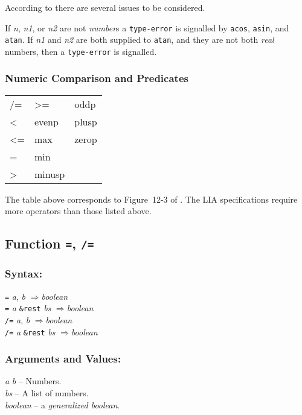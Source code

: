 \documentclass[10pt,fleqn]{article}
\newcommand{\code}[1]{\texttt{#1}}
\newcommand{\varname}[1]{\textit{#1}}
\newcommand{\clterm}[1]{\textit{#1}}
\newcommand{\RArrow}{$\Rightarrow$}
\newcommand{\DDictionaryItem}[1]{\vspace*{6pt}\noindent\hrulefill\vspace*{-9pt}\subsection*{#1}}
\newcommand{\DSyntax}{\subsubsection*{Syntax:}}
\newcommand{\DArgsNValues}{\subsubsection*{Arguments and Values:}}
\begin{document}
According to \cite{2008:IEEE-754} there are several issues to be
considered.

If \varname{n}, \varname{n1}, or \varname{n2} are not \clterm{number}s
a \code{type-error} is signalled by \code{acos}, \code{asin}, and
\code{atan}.  If \varname{n1} and \varname{n2} are both supplied to
\code{atan}, and they are not both \clterm{real} numbers, then a
\code{type-error} is signalled.


\newpage

\subsubsection*{Numeric Comparison and Predicates}

\begin{tt}
  \begin{tabular}{lll}
    /= &  >=     & oddp\\
    <  &  evenp  & plusp\\
    <= &  max    & zerop\\
    =  &  min    & \\
    >  &  minusp & \\
  \end{tabular}
\end{tt}

\noindent
The table above corresponds to Figure~12-3 of
\cite{1996:ANSIHyperSpec}.  The LIA specifications require more
operators than those listed above.


\DDictionaryItem{Function \code{=}, \code{/=}}
\index{*!\code{=}}
\index{*!\code{/=}}

\DSyntax{}

\code{=} \varname{a}, \varname{b} \RArrow \varname{boolean}\\
\code{=} \varname{a} \code{\&rest} \varname{bs} \RArrow \varname{boolean}\\
\code{/=} \varname{a}, \varname{b} \RArrow \varname{boolean}\\
\code{/=} \varname{a} \code{\&rest} \varname{bs} \RArrow \varname{boolean}

\DArgsNValues{}

\varname{a} \varname{b} -- Numbers.\\
\varname{bs} -- A list of numbers.\\
\varname{boolean} -- a \clterm{generalized boolean}.
\end{document}
